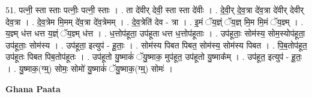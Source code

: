 \documentclass[17pt]{extarticle}
\begin{document}
51. पत्नी॒ स्ता स्ताः पत्नीः॒ पत्नी॒ स्ताः । . ता दे॑वीर् देवी॒ स्ता स्ता दे॑वीः । . दे॒वी॒र् दे॒व॒त्रा दे॑व॒त्रा दे॑वीर् देवीर् देव॒त्रा । . दे॒व॒त्रेम मि॒मम् दे॑व॒त्रा दे॑व॒त्रेमम् । . दे॒व॒त्रेति॑ देव - त्रा । . इ॒मं ॅय॒ज्ञ्ं ॅय॒ज्ञ् मि॒म मि॒मं ॅय॒ज्ञ्म् । . य॒ज्ञ्म् ध॑त्त धत्त य॒ज्ञ्ं ॅय॒ज्ञ्म् ध॑त्त । . ध॒त्तोप॑हूता॒ उप॑हूता धत्त ध॒त्तोप॑हूताः । . उप॑हूताः॒ सोम॑स्य॒ सोम॒स्योप॑हूता॒ उप॑हूताः॒ सोम॑स्य । . उप॑हूता॒ इत्युप॑ - हू॒ताः॒ । . सोम॑स्य पिबत पिबत॒ सोम॑स्य॒ सोम॑स्य पिबत । . पि॒ब॒तोप॑हूत॒ उप॑हूतः पिबत पिब॒तोप॑हूतः । . उप॑हूतो यु॒ष्माकं॑ ॅयु॒ष्माक॒ मुप॑हूत॒ उप॑हूतो यु॒ष्माक᳚म् । . उप॑हूत॒ इत्युप॑ - हू॒तः॒ । . यु॒ष्माक॒(ग्म्॒) सोमः॒ सोमो॑ यु॒ष्माकं॑ ॅयु॒ष्माक॒(ग्म्॒) सोमः॑ । \newline

\textbf{Ghana Paata } \newline
\end{document}
